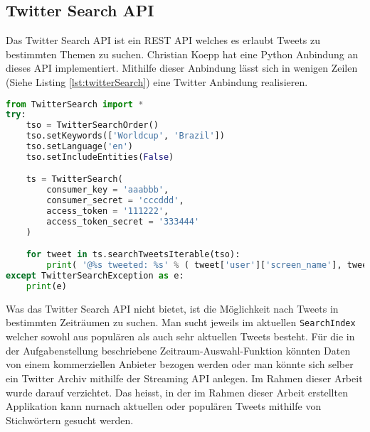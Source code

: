 \subsection{Twitter Search API}
\label{subsec:grundlagentwitter}
Das Twitter Search API\cite{twitterapi} ist ein REST API welches es erlaubt Tweets zu bestimmten Themen zu suchen. Christian Koepp hat eine Python Anbindung an dieses API implementiert\cite{twittersearch}. Mithilfe dieser Anbindung lässt sich in wenigen Zeilen (Siehe Listing \ref{lst:twitterSearch}) eine Twitter Anbindung realisieren.

\begin{lstlisting}[language=Python, caption={TwitterSearch Python-Twitter Anbindung}, label={lst:twitterSearch}]
from TwitterSearch import *
try:
    tso = TwitterSearchOrder()
    tso.setKeywords(['Worldcup', 'Brazil'])
    tso.setLanguage('en')
    tso.setIncludeEntities(False)

    ts = TwitterSearch(
    	consumer_key = 'aaabbb', 
    	consumer_secret = 'cccddd', 
    	access_token = '111222', 
    	access_token_secret = '333444'
    )

    for tweet in ts.searchTweetsIterable(tso):
        print( '@%s tweeted: %s' % ( tweet['user']['screen_name'], tweet['text'] ) )
except TwitterSearchException as e:
    print(e)
\end{lstlisting}

Was das Twitter Search API nicht bietet, ist die Möglichkeit nach Tweets in bestimmten Zeiträumen zu suchen. Man sucht jeweils im aktuellen \lstinline$SearchIndex$ welcher sowohl aus populären als auch sehr aktuellen Tweets besteht. Für die in der Aufgabenstellung beschriebene Zeitraum-Auswahl-Funktion könnten Daten von einem kommerziellen Anbieter bezogen werden oder man könnte sich selber ein Twitter Archiv mithilfe der Streaming API \cite{twitterstreaming} anlegen. Im Rahmen dieser Arbeit wurde darauf verzichtet. Das heisst, in der im Rahmen dieser Arbeit erstellten Applikation kann \flqq nur\frqq nach aktuellen oder populären Tweets mithilfe von Stichwörtern gesucht werden. 